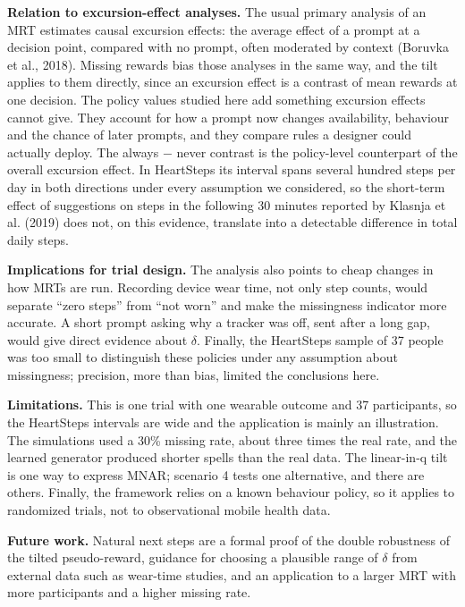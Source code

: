 \documentclass[12pt]{article}
\begin{document}
\textbf{Relation to excursion-effect analyses.} The usual primary analysis of an MRT estimates causal excursion effects: the average effect of a prompt at a decision point, compared with no prompt, often moderated by context (Boruvka et al., 2018). Missing rewards bias those analyses in the same way, and the tilt applies to them directly, since an excursion effect is a contrast of mean rewards at one decision. The policy values studied here add something excursion effects cannot give. They account for how a prompt now changes availability, behaviour and the chance of later prompts, and they compare rules a designer could actually deploy. The always $-$ never contrast is the policy-level counterpart of the overall excursion effect. In HeartSteps its interval spans several hundred steps per day in both directions under every assumption we considered, so the short-term effect of suggestions on steps in the following 30 minutes reported by Klasnja et al. (2019) does not, on this evidence, translate into a detectable difference in total daily steps.

\textbf{Implications for trial design.} The analysis also points to cheap changes in how MRTs are run. Recording device wear time, not only step counts, would separate ``zero steps'' from ``not worn'' and make the missingness indicator more accurate. A short prompt asking why a tracker was off, sent after a long gap, would give direct evidence about $\delta$. Finally, the HeartSteps sample of 37 people was too small to distinguish these policies under any assumption about missingness; precision, more than bias, limited the conclusions here.

\textbf{Limitations.} This is one trial with one wearable outcome and 37 participants, so the HeartSteps intervals are wide and the application is mainly an illustration. The simulations used a 30\% missing rate, about three times the real rate, and the learned generator produced shorter spells than the real data. The linear-in-q tilt is one way to express MNAR; scenario 4 tests one alternative, and there are others. Finally, the framework relies on a known behaviour policy, so it applies to randomized trials, not to observational mobile health data.

\textbf{Future work.} Natural next steps are a formal proof of the double robustness of the tilted pseudo-reward, guidance for choosing a plausible range of $\delta$ from external data such as wear-time studies, and an application to a larger MRT with more participants and a higher missing rate.
\end{document}
